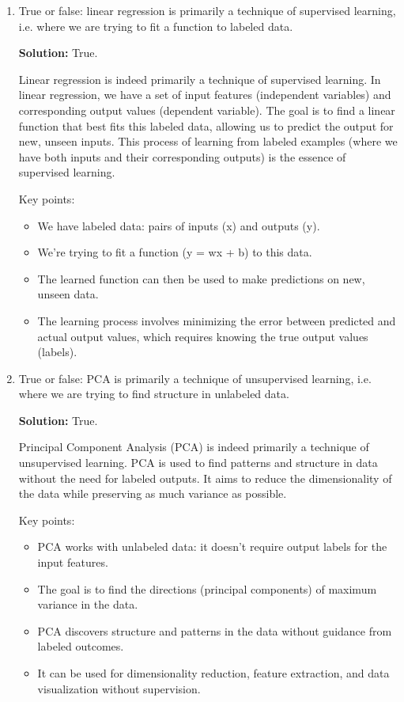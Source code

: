 \documentclass{article}
\begin{document}
\begin{enumerate}
    \item True or false: linear regression is primarily a technique of supervised learning, i.e. where we are trying to fit a function to labeled data.

    \textbf{Solution:} True. 
    
    Linear regression is indeed primarily a technique of supervised learning. In linear regression, we have a set of input features (independent variables) and corresponding output values (dependent variable). The goal is to find a linear function that best fits this labeled data, allowing us to predict the output for new, unseen inputs. This process of learning from labeled examples (where we have both inputs and their corresponding outputs) is the essence of supervised learning.

    Key points:
    \begin{itemize}
        \item We have labeled data: pairs of inputs (x) and outputs (y).
        \item We're trying to fit a function (y = wx + b) to this data.
        \item The learned function can then be used to make predictions on new, unseen data.
        \item The learning process involves minimizing the error between predicted and actual output values, which requires knowing the true output values (labels).
    \end{itemize}

    \item True or false: PCA is primarily a technique of unsupervised learning, i.e. where we are trying to find structure in unlabeled data.

    \textbf{Solution:} True.

    Principal Component Analysis (PCA) is indeed primarily a technique of unsupervised learning. PCA is used to find patterns and structure in data without the need for labeled outputs. It aims to reduce the dimensionality of the data while preserving as much variance as possible.

    Key points:
    \begin{itemize}
        \item PCA works with unlabeled data: it doesn't require output labels for the input features.
        \item The goal is to find the directions (principal components) of maximum variance in the data.
        \item PCA discovers structure and patterns in the data without guidance from labeled outcomes.
        \item It can be used for dimensionality reduction, feature extraction, and data visualization without supervision.
    \end{itemize}
    

\end{enumerate}
\end{document}
